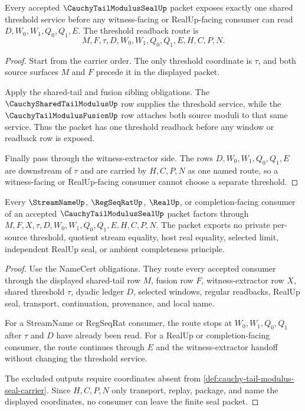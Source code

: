 \begin{theorem}
\label{thm:cauchy-tail-modulus-seal-threshold-readback}
Every accepted $\CauchyTailModulusSealUp$ packet exposes exactly one shared threshold service before any witness-facing or RealUp-facing consumer can read $D,W_0,W_1,Q_0,Q_1,E$. The threshold readback route is
$$
M,F,\tau,D,W_0,W_1,Q_0,Q_1,E,H,C,P,N.
$$
\end{theorem}
\begin{proof}
Start from the carrier order. The only threshold coordinate is $\tau$, and both source surfaces $M$ and $F$ precede it in the displayed packet.

Apply the shared-tail and fusion sibling obligations. The $\CauchySharedTailModulusUp$ row supplies the threshold service, while the $\CauchyTailModulusFusionUp$ row attaches both source moduli to that same service. Thus the packet has one threshold readback before any window or readback row is exposed.

Finally pass through the witness-extractor side. The rows $D,W_0,W_1,Q_0,Q_1,E$ are downstream of $\tau$ and are carried by $H,C,P,N$ as one named route, so a witness-facing or RealUp-facing consumer cannot choose a separate threshold.
\end{proof}

\begin{theorem}
\label{thm:cauchy-tail-modulus-seal-nonescape}
Every $\StreamNameUp$, $\RegSeqRatUp$, $\RealUp$, or completion-facing consumer of an accepted $\CauchyTailModulusSealUp$ packet factors through $M,F,X,\tau,D,W_0,W_1,Q_0,Q_1,E,H,C,P,N$. The packet exports no private per-source threshold, quotient stream equality, host real equality, selected limit, independent RealUp seal, or ambient completeness principle.
\end{theorem}
\begin{proof}
Use the NameCert obligations. They route every accepted consumer through the displayed shared-tail row $M$, fusion row $F$, witness-extractor row $X$, shared threshold $\tau$, dyadic ledger $D$, selected windows, regular readbacks, RealUp seal, transport, continuation, provenance, and local name.

For a StreamName or RegSeqRat consumer, the route stops at $W_0,W_1,Q_0,Q_1$ after $\tau$ and $D$ have already been read. For a RealUp or completion-facing consumer, the route continues through $E$ and the witness-extractor handoff without changing the threshold service.

The excluded outputs require coordinates absent from \autoref{def:cauchy-tail-modulus-seal-carrier}. Since $H,C,P,N$ only transport, replay, package, and name the displayed coordinates, no consumer can leave the finite seal packet.
\end{proof}

